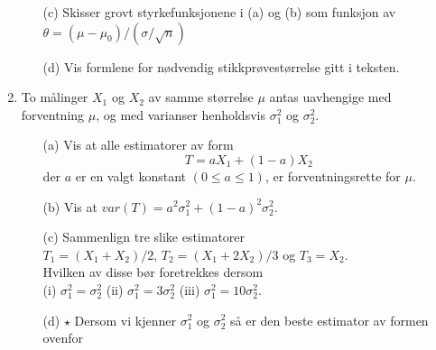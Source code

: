 \begin{enumerate}
\begin{itemize}
  \item[(c)]  Skisser grovt styrkefunksjonene i (a) og (b) som
               funksjon av $\theta=(\mu -{\mu}_0)/(\sigma /\sqrt n)$
  \item[(d)]  Vis formlene for nødvendig stikkprøvestørrelse gitt
              i teksten.
 \end{itemize}
\item     To målinger $X_1$ og $X_2$ av samme størrelse
          $\mu$ antas uavhengige med forventning $\mu$, og med
          varianser henholdsvis ${\sigma}_1^2$ og ${\sigma}_2^2$.
 \begin{itemize}
  \item[(a)]  Vis at alle estimatorer av form
               \[ T=aX_1 + (1-a)X_2\]
          der $a$ er en valgt konstant $(0\le a\le 1)$, er
          forventningsrette for $\mu$.
  \item[(b)]  Vis at $var(T)=a^2{\sigma}_1^2+ (1-a)^2{\sigma}_2^2$.
  \item[(c)]  Sammenlign tre slike estimatorer \\
          $T_1=(X_1 + X_2)/2$, $T_2=(X_1+2X_2) /3$ og $T_3=X_2$.\\
               Hvilken av disse bør foretrekkes dersom \\
               (i) ${\sigma}_1^2={\sigma}_2^2$ (ii)
               ${\sigma}_1^2=3{\sigma}_2^2$ (iii) ${\sigma}_1^2=10
               {\sigma}_2^2$.
  \item[(d)] $\star$ Dersom vi kjenner ${\sigma}_1^2$ og $\sigma_2^2$
          så er den beste estimator av formen ovenfor


\end{itemize}
\end{enumerate}

